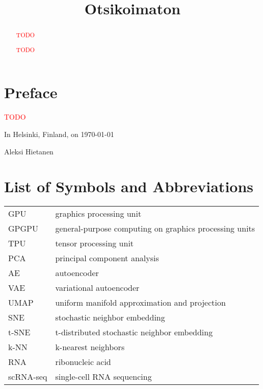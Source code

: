 \begin{abstract}

\textcolor{red}{TODO}

\end{abstract}

\begin{otherlanguage}{finnish}

\title{Otsikoimaton}
\examiner{}
\keywords{}

\begin{abstract}

\textcolor{red}{TODO}

\end{abstract}
\end{otherlanguage}

\chapter*{Preface}

\textcolor{red}{TODO}

\vspace{2\baselineskip}

In Helsinki, Finland, on \today

\vspace{2\baselineskip}

Aleksi Hietanen

\tableofcontents
\listoffigures
\listoftables
\chapter*{List of Symbols and Abbreviations}


\begin{tabular}[h]{@{} p{} p{} @{}}
GPU & graphics processing unit \\
GPGPU & general-purpose computing on graphics processing units \\
TPU & tensor processing unit \\
PCA & principal component analysis \\
AE & autoencoder \\
VAE & variational autoencoder \\
UMAP & uniform manifold approximation and projection \\
SNE & stochastic neighbor embedding \\
t-SNE & t-distributed stochastic neighbor embedding \\
k-NN & k-nearest neighbors \\
RNA & ribonucleic acid \\
scRNA-seq & single-cell RNA sequencing
\end{tabular}

